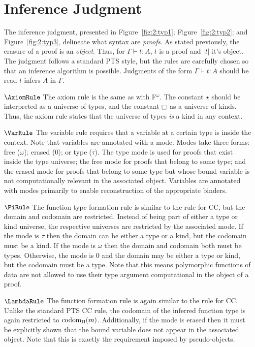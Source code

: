 \section{Inference Judgment}
\label{sec:2:judgments}


The inference judgment, presented in Figure~\ref{fig:2:typ1}; Figure~\ref{fig:2:typ2}; and Figure~\ref{fig:2:typ3}, delineate what syntax are \textit{proofs}.
As stated previously, the erasure of a proof is an \textit{object}.
Thus, for $\Gamma \vdash t : A$, $t$ is a proof and $|t|$ it's object.
The judgment follows a standard PTS style, but the rules are carefully chosen so that an inference algorithm is possible.
Judgments of the form $\Gamma \vdash t : A$ should be read $t$ infers $A$ in $\Gamma$.

$\AxiomRule$ The axiom rule is the same as with F$^\omega$.
The constant $\star$ should be interpreted as a universe of types, and the constant $\kind$ as a universe of kinds.
Thus, the axiom rule states that the universe of types \textit{is} a kind in any context.

$\VarRule$ The variable rule requires that a variable at a certain type is inside the context.
Note that variables are annotated with a mode.
Modes take three forms: free ($\omega$); erased ($0$); or type ($\tau$).
The type mode is used for proofs that exist inside the type universe; the free mode for proofs that belong to some type; and the erased mode for proofs that belong to some type but whose bound variable is not computationally relevant in the associated object.
Variables are annotated with modes primarily to enable reconstruction of the appropriate binders.




$\PiRule$ The function type formation rule is similar to the rule for CC, but the domain and codomain are restricted.
Instead of being part of either a type or kind universe, the respective universes are restricted by the associated mode.
If the mode is $\tau$ then the domain can be either a type or a kind, but the codomain must be a kind.
If the mode is $\omega$ then the domain and codomain both must be types.
Otherwise, the mode is $0$ and the domain may be either a type or kind, but the codomain must be a type.
Note that this means polymorphic functions of data are not allowed to use their type argument computational in the object of a proof.

$\LambdaRule$ The function formation rule is again similar to the rule for CC.
Unlike the standard PTS CC rule, the codomain of the inferred function type is again restricted to $\textnormal{codom}_\Pi(m)$.
Additionally, if the mode is erased then it must be explicitly shown that the bound variable does not appear in the associated object.
Note that this is exactly the requirement imposed by pseudo-objects.


